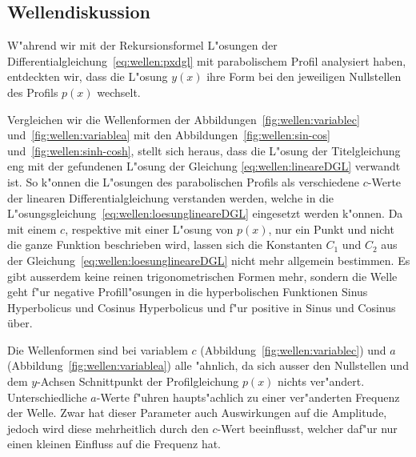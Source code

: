 \subsection{Wellendiskussion}
\label{sec:wellen:diskussionwellenform}
W"ahrend wir mit der Rekursionsformel L"osungen der 
Differentialgleichung~\eqref{eq:wellen:pxdgl} mit parabolischem Profil 
analysiert haben, entdeckten 
wir, dass die L"osung $y(x)$ ihre Form bei den jeweiligen Nullstellen des 
Profils $p(x)$ wechselt.

Vergleichen wir die Wellenformen der Abbildungen~\ref{fig:wellen:variablec} 
und~\ref{fig:wellen:variablea} mit den Abbildungen~\ref{fig:wellen:sin-cos} 
und~\ref{fig:wellen:sinh-cosh}, stellt sich heraus, dass die L"osung der 
Titelgleichung eng mit der gefundenen L"osung der Gleichung 
\eqref{eq:wellen:lineareDGL} verwandt ist. So k"onnen die L"osungen des 
parabolischen Profils als verschiedene $c$-Werte der linearen 
Differentialgleichung verstanden werden, welche in die 
L"osungsgleichung~\eqref{eq:wellen:loesunglineareDGL} eingesetzt werden 
k"onnen. 
Da mit einem $c$, respektive mit einer L"osung von $p(x)$, nur ein Punkt 
und nicht die ganze Funktion beschrieben wird, lassen sich die Konstanten $C_1$ 
und $C_2$ aus der Gleichung~\eqref{eq:wellen:loesunglineareDGL} nicht mehr 
allgemein bestimmen. Es gibt ausserdem keine reinen trigonometrischen Formen 
mehr, sondern die Welle geht f"ur negative Profill"osungen in die 
hyperbolischen Funktionen Sinus Hyperbolicus und Cosinus Hyperbolicus und f"ur 
positive in Sinus und Cosinus über.

Die Wellenformen sind bei variablem $c$ (Abbildung~\ref{fig:wellen:variablec}) 
und $a$ (Abbildung~\ref{fig:wellen:variablea}) alle "ahnlich, da sich ausser 
den Nullstellen und dem $y$-Achsen Schnittpunkt der Profilgleichung $p(x)$ 
nichts ver"andert. Unterschiedliche $a$-Werte f"uhren haupts"achlich zu einer 
ver"anderten Frequenz der Welle. Zwar hat dieser Parameter auch Auswirkungen 
auf die Amplitude, jedoch wird diese mehrheitlich durch den $c$-Wert 
beeinflusst, welcher daf"ur nur einen kleinen Einfluss auf die Frequenz hat.

